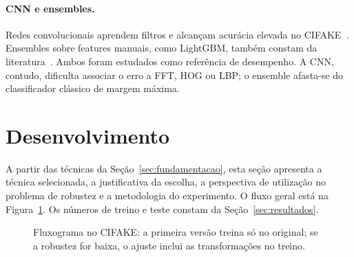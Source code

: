 \documentclass[12pt]{article}
\begin{document}
\paragraph{CNN e ensembles.}
Redes convolucionais aprendem filtros e alcançam acurácia elevada no CIFAKE~\cite{bird2024cifake}. Ensembles sobre features manuais, como LightGBM, também constam da literatura~\cite{nirob2026handcrafted}. Ambos foram estudados como referência de desempenho. A CNN, contudo, dificulta associar o erro a FFT, HOG ou LBP; o ensemble afasta-se do classificador clássico de margem máxima.

\section{Desenvolvimento}
\label{sec:desenvolvimento}

A partir das técnicas da Seção~\ref{sec:fundamentacao}, esta seção apresenta a técnica selecionada, a justificativa da escolha, a perspectiva de utilização no problema de robustez e a metodologia do experimento. O fluxo geral está na Figura~\ref{fig:fluxo}. Os números de treino e teste constam da Seção~\ref{sec:resultados}.

\begin{figure}[ht]
\centering
{}
\caption{Fluxograma no CIFAKE: a primeira versão treina só no original; se a robustez for baixa, o ajuste inclui as transformações no treino.}
\label{fig:fluxo}
\end{figure}
\end{document}
